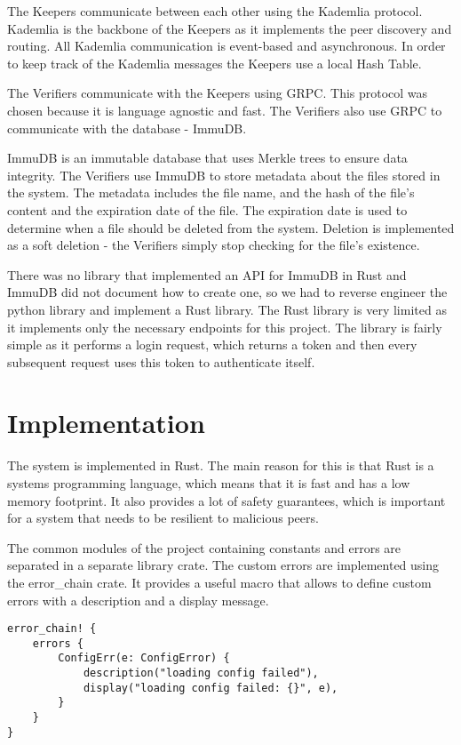 \documentclass[ twoside,openright,titlepage,numbers=noenddot,headinclude,%
                footinclude=true,cleardoublepage=empty,abstractoff, %
                BCOR=5mm,paper=a4,fontsize=11pt,%
                ngerman,american,%
                ]{scrreprt}
\begin{document}
The Keepers communicate between each other using the Kademlia protocol.
Kademlia is the backbone of the Keepers as it implements the peer discovery and routing.
All Kademlia communication is event-based and asynchronous.
In order to keep track of the Kademlia messages the Keepers use a local Hash Table.

The Verifiers communicate with the Keepers using GRPC.
This protocol was chosen because it is language agnostic and fast.
The Verifiers also use GRPC to communicate with the database - ImmuDB.

ImmuDB is an immutable database that uses Merkle trees to ensure data integrity.
The Verifiers use ImmuDB to store metadata about the files stored in the system.
The metadata includes the file name, and the hash of the file's content and the expiration date of the file.
The expiration date is used to determine when a file should be deleted from the system.
Deletion is implemented as a soft deletion - the Verifiers simply stop checking for the file's existence.

There was no library that implemented an API for ImmuDB in Rust and ImmuDB did not document how to create one,
so we had to reverse engineer the python library and implement a Rust library.
The Rust library is very limited as it implements only the necessary endpoints for this project.
The library is fairly simple as it performs a login request, which returns a token and then every
subsequent request uses this token to authenticate itself.


\section{Implementation}
\label{sec:implementation}

The system is implemented in Rust.
The main reason for this is that Rust is a systems programming language,
which means that it is fast and has a low memory footprint.
It also provides a lot of safety guarantees,
which is important for a system that needs to be resilient to malicious peers.

The common modules of the project containing constants and errors are separated in a separate library crate.
The custom errors are implemented using the error\_chain crate.
It provides a useful macro that allows to define custom errors with a description and a display message.
\begin{verbatim}
error_chain! {
    errors {
        ConfigErr(e: ConfigError) {
            description("loading config failed"),
            display("loading config failed: {}", e),
        }
    }
}
\end{verbatim}
\end{document}
